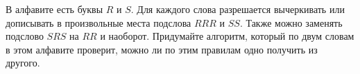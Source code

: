 В алфавите есть буквы $R$ и $S$. Для каждого слова разрешается вычеркивать или дописывать в произвольные
места подслова $RRR$ и $SS$. Также можно заменять подслово $SRS$ на $RR$ и наоборот. Придумайте алгоритм,
который по двум словам в этом алфавите проверит, можно ли по этим правилам одно получить из другого.
